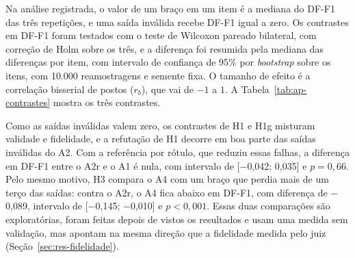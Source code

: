 \begin{apendicesenv}
Na análise registrada, o valor de um braço em um item é a mediana do DF-F1 das três repetições, e uma saída inválida recebe DF-F1 igual a zero. Os contrastes em DF-F1 foram testados com o teste de Wilcoxon pareado bilateral, com correção de Holm sobre os três, e a diferença foi resumida pela mediana das diferenças por item, com intervalo de confiança de 95\% por \textit{bootstrap} sobre os itens, com 10.000 reamostragens e semente fixa. O tamanho de efeito é a correlação bisserial de postos ($r_b$), que vai de $-1$ a $1$. A Tabela~\ref{tab:ap-contrastes} mostra os três contrastes.

\begin{table}[htb]
\end{table}

Como as saídas inválidas valem zero, os contrastes de H1 e H1g misturam validade e fidelidade, e a refutação de H1 decorre em boa parte das saídas inválidas do A2. Com a referência por rótulo, que reduziu essas falhas, a diferença em DF-F1 entre o A2r e o A1 é nula, com intervalo de [$-$0,042; 0,035] e $p = 0{,}66$. Pelo mesmo motivo, H3 compara o A4 com um braço que perdia mais de um terço das saídas: contra o A2r, o A4 fica abaixo em DF-F1, com diferença de $-$0,089, intervalo de [$-$0,145; $-$0,010] e $p < 0{,}001$. Essas duas comparações são exploratórias, foram feitas depois de vistos os resultados e usam uma medida sem validação, mas apontam na mesma direção que a fidelidade medida pelo juiz (Seção~\ref{sec:res-fidelidade}).

\end{apendicesenv}
